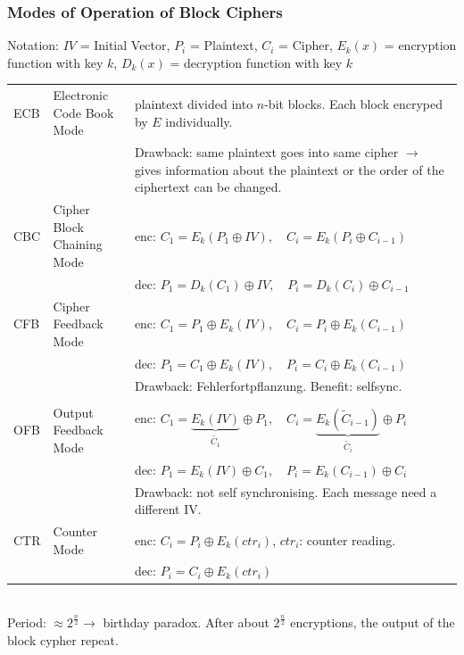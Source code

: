 \subsubsection{Modes of Operation of Block Ciphers}
Notation: $IV$ = Initial Vector, $P_i$ = Plaintext, $C_i$ = Cipher, $E_k(x)$ = encryption function with key $k$, $D_k(x)$ = decryption function with key $k$\\
\begin{tabular}{|l l |p{12cm}|}
\hline
	ECB	&	Electronic Code Book Mode	&	plaintext divided into $n$-bit blocks. Each block encryped by $E$ individually. \\
		&								&	Drawback: same plaintext goes into same cipher $\to$ gives information about the plaintext or the order of the ciphertext can be changed.\\
\hline
	CBC	&	Cipher Block Chaining Mode	&	enc: $C_1=E_k(P_1 \oplus IV), \quad C_i=E_k(P_i \oplus C_{i-1})$ \\
		&								&	dec: $P_1=D_k(C_1) \oplus IV, \quad P_i=D_k(C_i) \oplus C_{i-1}$	\\	
\hline
	CFB &	Cipher Feedback Mode		& 	enc: $C_1=P_1 \oplus E_k(IV), \quad C_i=P_i \oplus E_k(C_{i-1})$\\
		&								&	dec: $P_1=C_1 \oplus E_k(IV), \quad P_i=C_i \oplus E_k(C_{i-1})$\\
		&								&	Drawback: Fehlerfortpflanzung. Benefit: selfsync.\\
\hline
&&	\\
	OFB	&	Output Feedback Mode		& 	enc: $C_1=\underbrace{E_k(IV)}_{\tilde{C_1}} \oplus P_1, \quad C_i=\underbrace{E_k(\tilde{C}_{i-1})}_{\tilde{C_i}} \oplus P_i $\\
		&								& 	dec: $P_1=E_k(IV) \oplus C_1, \quad P_i=E_k(C_{i-1}) \oplus C_i $\\
		&								&	Drawback: not self synchronising. Each message need a different IV.\\
\hline
	CTR	&	Counter Mode				& 	enc: $C_i=P_i \oplus E_k(ctr_i) $, $ctr_i$: counter reading.\\
		&								&	dec: $P_i=C_i \oplus E_k(ctr_i) $\\
\hline
\end{tabular}\\

Period: $\approx 2^{\frac{n}{2}} \to $ birthday paradox. After about $2^{\frac{n}{2}}$ encryptions, the output of the block cypher repeat.

